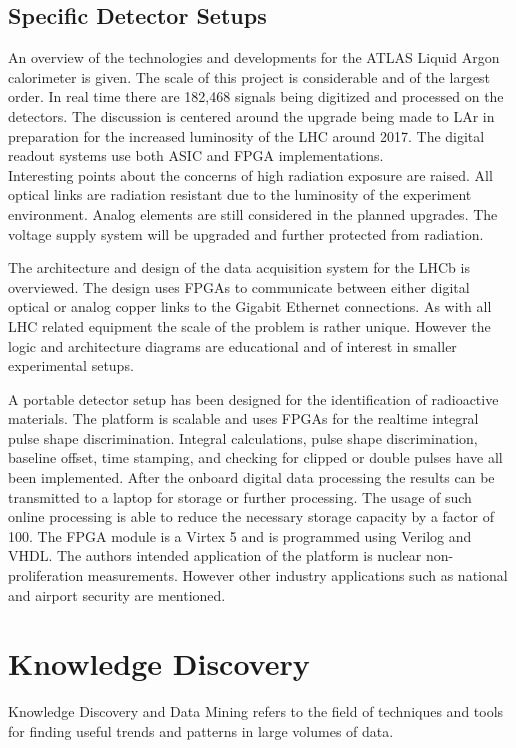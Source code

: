 \documentclass[12pt]{article}
\begin{document}
\begin{doublespacing}
\subsection{Specific Detector Setups}

{\large\textbf{\cite{Chen2010261}}}
An overview of the technologies and developments for the ATLAS Liquid Argon calorimeter is given.
The scale of this project is considerable and of the largest order.
In real time there are 182,468 signals being digitized and processed on the detectors.
The discussion is centered around the upgrade being made to LAr in preparation for the increased luminosity of the LHC around 2017. The digital readout systems use both ASIC and FPGA implementations.
\\

Interesting points about the concerns of high radiation exposure are raised.
All optical links are radiation resistant due to the luminosity of the experiment environment.
Analog elements are still considered in the planned upgrades.
The voltage supply system will be upgraded and further protected from radiation.


{\large\textbf{\cite{Haefeli2006119}}}
The architecture and design of the data acquisition system for the LHCb is overviewed.
The design uses FPGAs to communicate between either digital optical or analog copper links to the Gigabit Ethernet connections.
As with all LHC related equipment the scale of the problem is rather unique.
However the logic and architecture diagrams are educational and of interest in smaller experimental setups.


{\large\textbf{\cite{Schiffer2011491}}}
A portable detector setup has been designed for the identification of radioactive materials.
The platform is scalable and uses FPGAs for the realtime integral pulse shape discrimination.
Integral calculations, pulse shape discrimination, baseline offset, time stamping, and checking for clipped or double pulses have all been implemented.
After the onboard digital data processing the results can be transmitted to a laptop for storage or further processing.
The usage of such online processing is able to reduce the necessary storage capacity by a factor of 100. The FPGA module is a Virtex 5 and is programmed using Verilog and VHDL.
The authors intended application of the platform is nuclear non-proliferation measurements.
However other industry applications such as national and airport security are mentioned.
\\[20pt]

\section{Knowledge Discovery}
Knowledge Discovery and Data Mining refers to the field of techniques and tools for finding useful trends and patterns in large volumes of data.


\pagebreak


\end{doublespacing}



\end{document}
